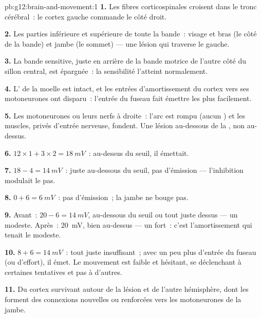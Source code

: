 \begin{solution}{pb:g12:brain-and-movement:1}
\textbf{1.} Les fibres corticospinales croisent dans le tronc
cérébral~: le cortex gauche commande le côté droit.

\textbf{2.} Les parties inférieure et supérieure de toute la bande~:
visage et bras (le côté de la bande) et jambe (le sommet) --- une
lésion qui traverse le  gauche.

\textbf{3.} La bande sensitive, juste en arrière de la bande motrice
de l'autre côté du sillon central, est épargnée~: la sensibilité
l'atteint normalement.

\textbf{4.} L' de la moelle est intact, et les entrées
d'amortissement du cortex vers ses motoneurones ont disparu~: l'entrée
du fuseau fait émettre les  plus facilement.

\textbf{5.} Les motoneurones ou leurs nerfs à droite~: l'arc est rompu
(aucun ) et les muscles, privés d'entrée nerveuse, fondent. Une
lésion au-dessous de la , non au-dessus.

\textbf{6.} $12 \times 1 + 3 \times 2 = \qty{18}{mV}$~: au-dessus du
seuil, il émettait.

\textbf{7.} $18 - 4 = \qty{14}{mV}$~: juste au-dessous du seuil, pas
d'émission --- l'inhibition modulait le pas.

\textbf{8.} $0 + 6 = \qty{6}{mV}$~: pas d'émission~; la jambe ne bouge
pas.

\textbf{9.} Avant~: $20 - 6 = \qty{14}{mV}$, au-dessous du seuil ou
tout juste dessus --- un  modeste. Après~: \qty{20}{mV}, bien
au-dessus --- un  fort~: c'est l'amortissement qui tenait le
 modeste.

\textbf{10.} $8 + 6 = \qty{14}{mV}$~: tout juste insuffisant~; avec un
peu plus d'entrée du fuseau (ou d'effort), il émet. Le mouvement est
faible et hésitant, se déclenchant à certaines tentatives et pas à
d'autres.

\textbf{11.} Du cortex survivant autour de la lésion et de l'autre
hémisphère, dont les  forment des connexions nouvelles ou
renforcées vers les motoneurones de la jambe.


\end{solution}
